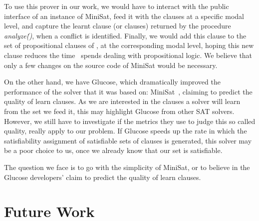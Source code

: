 To use this prover in our work, we would have to interact with the public
interface of an instance of MiniSat, feed it with the clauses at a specific
modal level, and capture the learnt clause (or clauses) returned by the
procedure \textit{analyze\.()}, when a conflict is identified. Finally, we would
add this clause to the set of propositional clauses of \ksp, at the
corresponding modal level, hoping this new clause reduces the time \ksp~spends
dealing with propositional logic. We believe that only a few changes on the
source code of MiniSat would be necessary.

On the other hand, we have Glucose, which dramatically improved the performance
of the solver that it was based on: MiniSat~\cite{glucose}, claiming to predict
the quality of learn clauses. As we are interested in the clauses a solver will
learn from the set we feed it, this may highlight Glucose from other SAT
solvers. However, we still have to investigate if the metrics they use to judge
this so called quality, really apply to our problem. If Glucose speeds up the
rate in which the satisfiability assignment of satisfiable sets of clauses is
generated, this solver may be a poor choice to us, once we already know that
our set is satisfiable.

The question we face is to go with the simplicity of MiniSat, or to believe in
the Glucose developers' claim to predict the quality of learn clauses.

\section{Future Work}
